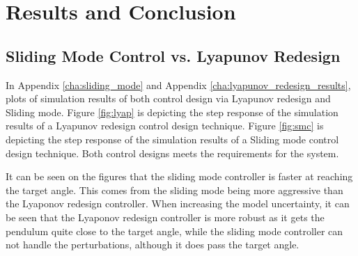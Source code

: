 \section{Results and Conclusion} %
\label{sec:results_and_conclusion}

\subsection{Sliding Mode Control vs. Lyapunov Redesign} %
\label{sub:sliding_mode_control_vs_lyapunov_redesign}
In Appendix \ref{cha:sliding_mode} and Appendix \ref{cha:lyapunov_redesign_results}, plots of simulation results of both
control design via Lyapunov redesign and Sliding mode. Figure \ref{fig:lyap} is depicting the step response of the
simulation results of a Lyapunov redesign control design technique. Figure \ref{fig:smc} is depicting the step response
of the simulation results of a Sliding mode control design technique. Both control designs meets the requirements for the
system.

It can be seen on the figures that the sliding mode controller is faster at reaching the target angle. This comes from the sliding mode being more aggressive than the Lyaponov redesign controller. When increasing the model uncertainty, it can be seen that the Lyaponov redesign controller is more robust as it gets the pendulum quite close to the target angle, while the sliding mode controller can not handle the perturbations, although it does pass the target angle.

